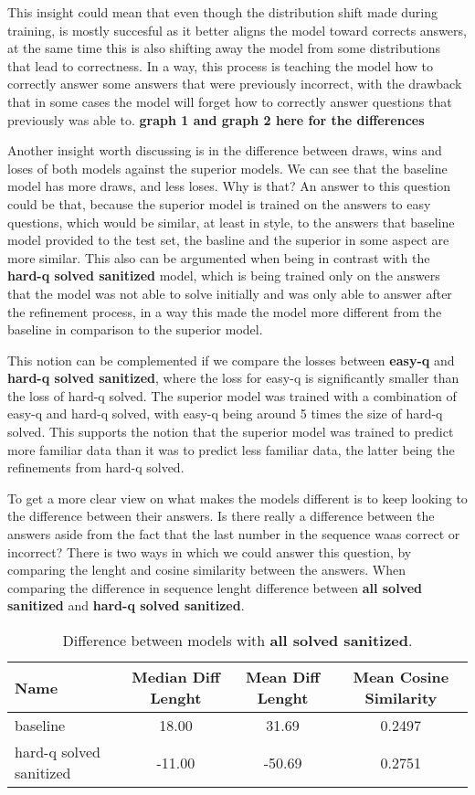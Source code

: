 \documentclass[a4paper,10pt]{article}
\begin{document}
This insight could mean that even though the distribution shift made during training, is mostly succesful as it better aligns the model toward corrects answers, at the same time this is also shifting away the model from some distributions that lead to correctness. In a way, this process is teaching the model how to correctly answer some answers that were previously incorrect, with the drawback that in some cases the model will forget how to correctly answer questions that previously was able to. 
\textbf{graph 1 and graph 2 here for the differences}

Another insight worth discussing is in the difference between draws, wins and loses of both models against the superior models. We can see that the baseline model has more draws, and less loses. Why is that? An answer to this question could be that, because the superior model is trained on the answers to easy questions, which would be similar, at least in style, to the answers that baseline model provided to the test set, the basline and the superior in some aspect are more similar. This also can be argumented when being in contrast with the \textbf{hard-q solved sanitized} model, which is being trained only on the answers that the model was not able to solve initially and was only able to answer after the refinement process, in a way this made the model more different from the baseline in comparison to the superior model.

This notion can be complemented if we compare the losses between \textbf{easy-q} and \textbf{hard-q solved sanitized}, where the loss for easy-q is significantly smaller than the loss of hard-q solved. The superior model was trained with a combination of easy-q and hard-q solved, with easy-q being around 5 times the size of hard-q solved. This supports the notion that the superior model was trained to predict more familiar data than it was to predict less familiar data, the latter being the refinements from hard-q solved.

To get a more clear view on what makes the models different is to keep looking to the difference between their answers.  Is there really a difference between the answers aside from the fact that the last number in the sequence waas correct or incorrect? There is two ways in which we could answer this question, by comparing the lenght and cosine similarity between the answers. When comparing the difference in sequence lenght difference between \textbf{all solved sanitized} and \textbf{hard-q solved sanitized}.

\begin{table}[ht]
\centering
 \begin{tabular}{lccc}
 Name  & Median Diff Lenght & Mean Diff Lenght & Mean Cosine Similarity \\
 \hline
 baseline & 18.00 & 31.69  & 0.2497 \\
 hard-q solved sanitized & -11.00 & -50.69 & 0.2751 \\
 \end{tabular}
 \caption{Difference between models with \textbf{all solved sanitized}. }
\end{table}
\end{document}
